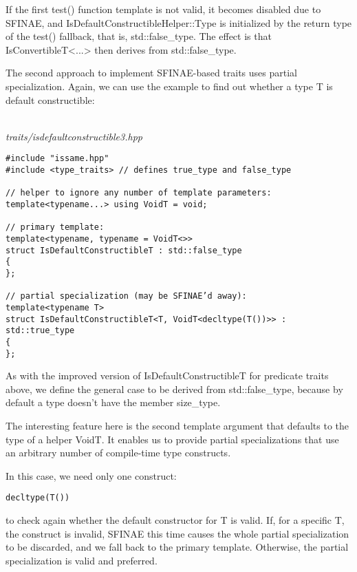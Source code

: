 If the first test() function template is not valid, it becomes disabled due to SFINAE, and IsDefaultConstructibleHelper::Type is initialized by the return type of the test() fallback, that is, std::false\_type. The effect is that IsConvertibleT<...> then derives from std::false\_type.


The second approach to implement SFINAE-based traits uses partial specialization. Again, we can use the example to find out whether a type T is default constructible:

\hspace*{\fill} \\ %
\noindent
\textit{traits/isdefaultconstructible3.hpp}
\begin{lstlisting}[style=styleCXX]
#include "issame.hpp"
#include <type_traits> // defines true_type and false_type

// helper to ignore any number of template parameters:
template<typename...> using VoidT = void;

// primary template:
template<typename, typename = VoidT<>>
struct IsDefaultConstructibleT : std::false_type
{
};

// partial specialization (may be SFINAE’d away):
template<typename T>
struct IsDefaultConstructibleT<T, VoidT<decltype(T())>> : std::true_type
{
};
\end{lstlisting}

As with the improved version of IsDefaultConstructibleT for predicate traits above, we define the general case to be derived from std::false\_type, because by default a type doesn’t have the member size\_type.

The interesting feature here is the second template argument that defaults to the type of a helper VoidT. It enables us to provide partial specializations that use an arbitrary number of compile-time type constructs. 

In this case, we need only one construct:

\begin{lstlisting}[style=styleCXX]
decltype(T())
\end{lstlisting}

to check again whether the default constructor for T is valid. If, for a specific T, the construct is invalid, SFINAE this time causes the whole partial specialization to be discarded, and we fall back to the primary template. Otherwise, the partial specialization is valid and preferred.

